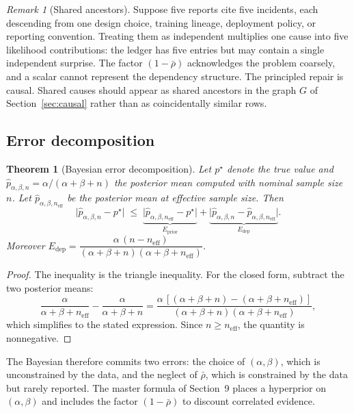 \documentclass[11pt]{article}
\newtheorem{theorem}{Theorem}[section]
\theoremstyle{remark}
\newtheorem{remark}{Remark}[section]
\newcommand{\rhobar}{\bar{\rho}}
\begin{document}
\begin{remark}[Shared ancestors]
Suppose five reports cite five incidents, each descending from one design choice, training lineage, deployment policy, or reporting convention. Treating them as independent multiplies one cause into five likelihood contributions: the ledger has five entries but may contain a single independent surprise. The factor $(1-\rhobar)$ acknowledges the problem coarsely, and a scalar cannot represent the dependency structure. The principled repair is causal. Shared causes should appear as shared ancestors in the graph $G$ of Section~\ref{sec:causal} rather than as coincidentally similar rows.
\end{remark}

\subsection{Error decomposition}

\begin{theorem}[Bayesian error decomposition]\label{thm:bayes}
Let $p^{\star}$ denote the true value and $\hat p_{\alpha,\beta,n}=\alpha/(\alpha+\beta+n)$ the posterior mean computed with nominal sample size $n$. Let $\hat p_{\alpha,\beta,n_{\mathrm{eff}}}$ be the posterior mean at effective sample size. Then
\begin{equation}
\bigl|\hat p_{\alpha,\beta,n}-p^{\star}\bigr|\;\le\;\underbrace{\bigl|\hat p_{\alpha,\beta,n_{\mathrm{eff}}}-p^{\star}\bigr|}_{E_{\mathrm{prior}}}+\underbrace{\bigl|\hat p_{\alpha,\beta,n}-\hat p_{\alpha,\beta,n_{\mathrm{eff}}}\bigr|}_{E_{\mathrm{dep}}}.
\end{equation}
Moreover $E_{\mathrm{dep}}=\dfrac{\alpha\,(n-n_{\mathrm{eff}})}{(\alpha+\beta+n)(\alpha+\beta+n_{\mathrm{eff}})}$.
\end{theorem}
\begin{proof}
The inequality is the triangle inequality. For the closed form, subtract the two posterior means:
\[
\frac{\alpha}{\alpha+\beta+n_{\mathrm{eff}}}-\frac{\alpha}{\alpha+\beta+n}
=\frac{\alpha\,[(\alpha+\beta+n)-(\alpha+\beta+n_{\mathrm{eff}})]}{(\alpha+\beta+n)(\alpha+\beta+n_{\mathrm{eff}})},
\]
which simplifies to the stated expression. Since $n\ge n_{\mathrm{eff}}$, the quantity is nonnegative. \qedhere
\end{proof}

The Bayesian therefore commits two errors: the choice of $(\alpha,\beta)$, which is unconstrained by the data, and the neglect of $\rhobar$, which is constrained by the data but rarely reported. The master formula of Section~9 places a hyperprior on $(\alpha,\beta)$ and includes the factor $(1-\rhobar)$ to discount correlated evidence.
\end{document}
